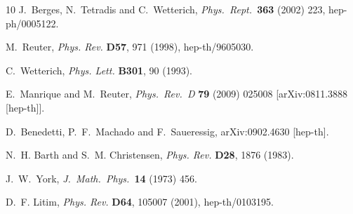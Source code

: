 \documentclass[11pt,reqno]{article}
\newcommand{\2}{\sqrt{2\,}}
\begin{document}
\begin{thebibliography}{10}
  J.~Berges, N.~Tetradis and C.~Wetterich,
{\it  Phys.\ Rept.\  }{\bf 363} (2002) 223, 
  hep-ph/0005122.



M.~Reuter,
{\it Phys. Rev. }{\bf D57}, 971 (1998), hep-th/9605030.

C.~Wetterich,
{\it Phys. Lett. }{\bf B301}, 90 (1993).

  E.~Manrique and M.~Reuter,
  {\it Phys.\ Rev.\  D }{\bf 79} (2009) 025008
  [arXiv:0811.3888 [hep-th]].

  D.~Benedetti, P.~F.~Machado and F.~Saueressig,
  arXiv:0902.4630 [hep-th].


N.~H. Barth and S.~M. Christensen,
{\it Phys. Rev. }{\bf D28}, 1876 (1983).

J.~W.~York,
{\it  J.\ Math.\ Phys.\  }{\bf 14} (1973) 456.

D.~F. Litim,
{\it Phys. Rev. }{\bf D64}, 105007 (2001), hep-th/0103195.



\end{thebibliography}
\end{document}
